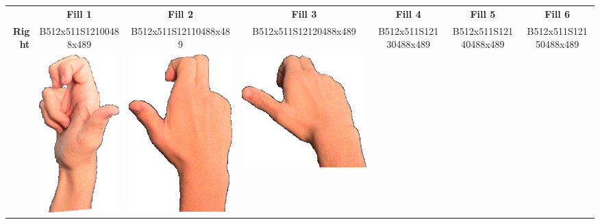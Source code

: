 \documentclass{article}
\begin{document}
\begin{center}
\begin{tabular}{r*{6}{c}}
&\textbf{Fill 1}&\textbf{Fill 2}&\textbf{Fill 3}&\textbf{Fill 4}&\textbf{Fill 5}&\textbf{Fill 6}\\
\multirow{2}{*}{\textbf{Right}}&
B512x511S12100488x489&
B512x511S12110488x489&
B512x511S12120488x489&
B512x511S12130488x489&
B512x511S12140488x489&
B512x511S12150488x489\\
&
\includegraphics[scale=0.1]{images/03-02-1.jpg}&
\includegraphics[scale=0.1]{images/03-02-2.jpg}&
\includegraphics[scale=0.1]{images/03-02-3.jpg}&

\end{tabular}
\end{center}
\end{document}
